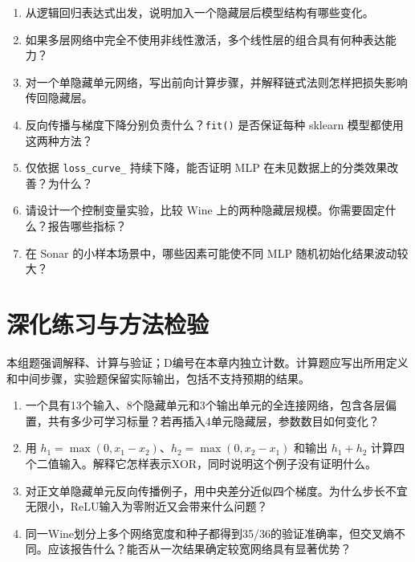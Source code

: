 \chapterexercise
\begin{enumerate}
\item 从逻辑回归表达式出发，说明加入一个隐藏层后模型结构有哪些变化。
\item 如果多层网络中完全不使用非线性激活，多个线性层的组合具有何种表达能力？
\item 对一个单隐藏单元网络，写出前向计算步骤，并解释链式法则怎样把损失影响传回隐藏层。
\item 反向传播与梯度下降分别负责什么？\texttt{fit()} 是否保证每种 sklearn 模型都使用这两种方法？
\item 仅依据 \texttt{loss\_curve\_} 持续下降，能否证明 MLP 在未见数据上的分类效果改善？为什么？
\item 请设计一个控制变量实验，比较 Wine 上的两种隐藏层规模。你需要固定什么？报告哪些指标？
\item 在 Sonar 的小样本场景中，哪些因素可能使不同 MLP 随机初始化结果波动较大？
\end{enumerate}

\section*{深化练习与方法检验}
本组题强调解释、计算与验证；D编号在本章内独立计数。计算题应写出所用定义和中间步骤，实验题保留实际输出，包括不支持预期的结果。
\begin{enumerate}[label=D\arabic*.]
\item 一个具有13个输入、8个隐藏单元和3个输出单元的全连接网络，包含各层偏置，共有多少可学习标量？若再插入4单元隐藏层，参数数目如何变化？
\item 用 $h_1=\max(0,x_1-x_2)$、$h_2=\max(0,x_2-x_1)$ 和输出 $h_1+h_2$ 计算四个二值输入。解释它怎样表示XOR，同时说明这个例子没有证明什么。
\item 对正文单隐藏单元反向传播例子，用中央差分近似四个梯度。为什么步长不宜无限小，ReLU输入为零附近又会带来什么问题？
\item 同一Wine划分上多个网络宽度和种子都得到35/36的验证准确率，但交叉熵不同。应该报告什么？能否从一次结果确定较宽网络具有显著优势？
\end{enumerate}
